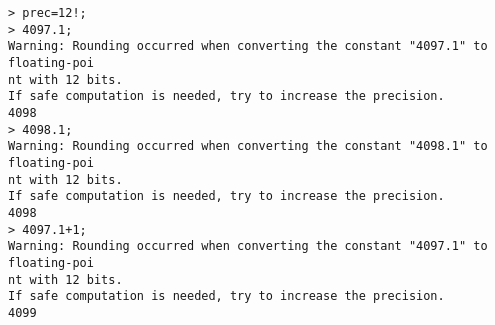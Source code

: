 \begin{center}\begin{minipage}{15cm}\begin{Verbatim}[frame=single]
> prec=12!;
> 4097.1;
Warning: Rounding occurred when converting the constant "4097.1" to floating-poi
nt with 12 bits.
If safe computation is needed, try to increase the precision.
4098
> 4098.1;
Warning: Rounding occurred when converting the constant "4098.1" to floating-poi
nt with 12 bits.
If safe computation is needed, try to increase the precision.
4098
> 4097.1+1;
Warning: Rounding occurred when converting the constant "4097.1" to floating-poi
nt with 12 bits.
If safe computation is needed, try to increase the precision.
4099
\end{Verbatim}
\end{minipage}\end{center}
